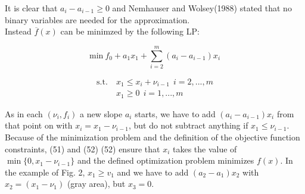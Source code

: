 \documentclass[a4paper, 12pt]{article}
\begin{document}
\noindent
It is clear that $a_{i}-a_{i-1}\geq0$ and Nemhauser and Wolsey(1988) stated that no binary variables are needed for the approximation.\\
Instead $\overline{f}(x)$ can be minimzed by the following LP:
\begin{large}
\begin{equation*}
\mathrm{min}\ f_{0}+a_{1}x_{1}+\sum_{i=2}^m\left(a_{i}-a_{i-1}\right)x_{i}
\end{equation*}
\end{large}
\begin{large}
\begin{align*}
\mathrm{s.t.}\ &x_{1}\leq x_{i}+\nu_{i-1}\ \ i=2,...,m \\
&x_{1}\geq0\ \ i=1,...,m
\end{align*}
\end{large}
\noindent
As in each $\left(\nu_{i},f_{i}\right)$ a new slope $a_i$ starts, we have to add $\left(a_i-a_{i-1}\right)x_{i}$ from that point on with $x_{i}=x_{1}-\nu_{i-1}$, but do not subtract anything if $x_{1} \le \nu_{i-1}$. Because of the minimization problem and the definition of the objective function constraints, (51) and (52) (52) ensure that $x_{i}$ takes the value of $\min\{0,x_{1}-\nu_{i-1}\}$ and the defined optimization problem minimizes $f(x)$. In the example of Fig. 2, $x_1 \ge v_1$ and we have to add $\left(a_2 - a_1\right)x_2$ with $x_2=\left(x_1-\nu_1\right)$ (gray area), but $x_3=0$.
\end{document}

